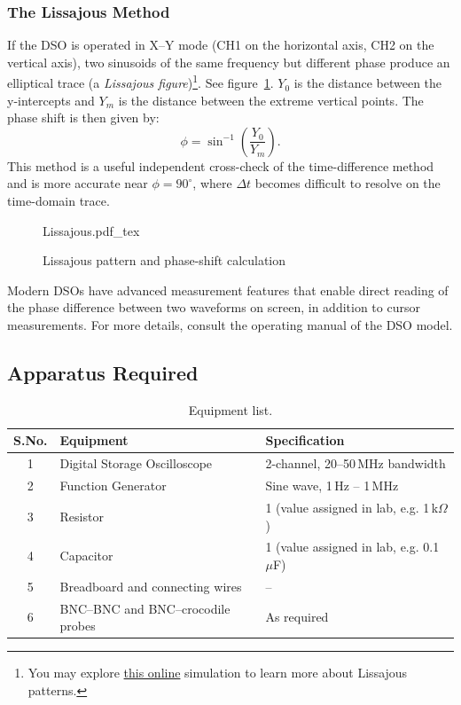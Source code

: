\subsubsection{The Lissajous Method}

If the DSO is operated in X--Y mode (CH1 on the horizontal axis, CH2 on the vertical axis), two sinusoids of the same frequency but different phase produce an elliptical trace (a \emph{Lissajous figure})\footnote{You may explore \href{https://c00lnerd.com/simulations/lissajous-explorer}{this online} simulation to learn more about Lissajous patterns.}. See figure~\ref{fig:lissajous}. $Y_0$ is the distance between the y-intercepts and $Y_m$ is the distance between the extreme vertical points. The phase shift is then given by:
\begin{equation}
	\phi = \sin^{-1}\!\left(\frac{Y_0}{Y_m}\right).
	\label{eq:lissajous}
\end{equation}
This method is a useful independent cross-check of the time-difference method and is more accurate near $\phi = 90^\circ$, where $\Delta t$ becomes difficult to resolve on the time-domain trace.
\begin{figure}
	\def\svgwidth{0.5\textwidth}
	{Lissajous.pdf_tex}
	\caption{Lissajous pattern and phase-shift calculation}
	\label{fig:lissajous}
\end{figure}
\begin{notebox}
	Modern DSOs have advanced measurement features that enable direct reading of the phase difference between two waveforms on screen, in addition to cursor measurements. For more details, consult the operating manual of the DSO model. 
\end{notebox}

\subsection*{Apparatus Required}
\begin{table}[!ht]
	\centering
	\begin{tabular}{@{}cll@{}}
		\toprule
		S.No. & Equipment & Specification \\
		\midrule
		1 & Digital Storage Oscilloscope & 2-channel, 20--50\,MHz bandwidth \\
		2 & Function Generator & Sine wave, 1\,Hz -- 1\,MHz \\
		3 & Resistor & 1 (value assigned in lab, e.g. 1\,k$\Omega$) \\
		4 & Capacitor & 1 (value assigned in lab, e.g. 0.1\,$\mu$F) \\
		5 & Breadboard and connecting wires & -- \\
		6 & BNC--BNC and BNC--crocodile probes & As required \\
		\bottomrule
	\end{tabular}
	\caption{Equipment list.}
\end{table}


